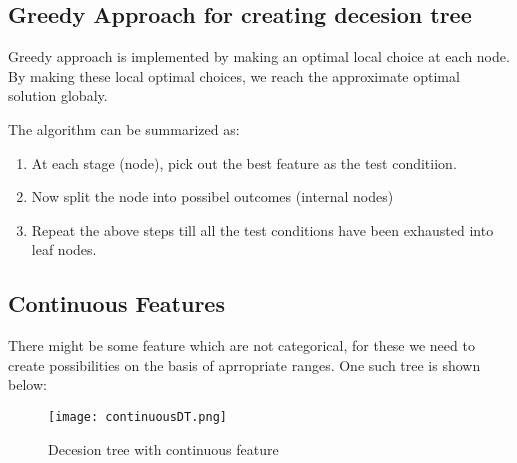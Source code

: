 \documentclass[12pt, A4]{report}
\begin{document}
\vspace{5mm}
\subsection*{Greedy Approach for creating decesion tree}
	Greedy approach is implemented by making an optimal local choice at each node. By making these local optimal choices, we reach the approximate optimal solution globaly.

	The algorithm can be summarized as: 
	\begin{enumerate}
		\item At each stage (node), pick out the best feature as the test conditiion.
		\item Now split the node into possibel outcomes (internal nodes)
		\item Repeat the above steps till all the test conditions have been exhausted into leaf nodes.
	\end{enumerate}

\vspace{5mm}
\subsection*{Continuous Features}
	There might be some feature which are not categorical, for these we need to create possibilities on the basis of aprropriate ranges. One such tree is shown below:
	\begin{figure}[h]
		\centering
		\texttt{[image: continuousDT.png]}
		\caption{Decesion tree with continuous feature}
	\end{figure}
\end{document}
